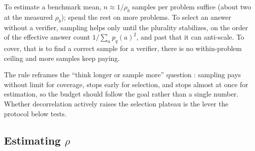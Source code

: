 \documentclass[11pt]{article}
\begin{document}
\begin{takeaway}
To estimate a benchmark mean, $n \approx 1/\rho_b$ samples per problem suffice (about two at the measured $\rho_b$); spend the rest on more problems. To select an answer without a verifier, sampling helps only until the plurality stabilizes, on the order of the effective answer count $1/\sum_a p_q(a)^2$, and past that it can anti-scale. To cover, that is to find a correct sample for a verifier, there is no within-problem ceiling and more samples keep paying.
\end{takeaway}

The rule reframes the ``think longer or sample more'' question \citep{snell2024scaling,wu2024inference,liu2025surpass}: sampling pays without limit for coverage, stops early for selection, and stops almost at once for estimation, so the budget should follow the goal rather than a single number. Whether decorrelation actively raises the selection plateau is the lever the protocol below tests.

\subsection{Estimating $\rho$}
\label{sec:estimate}
\end{document}
